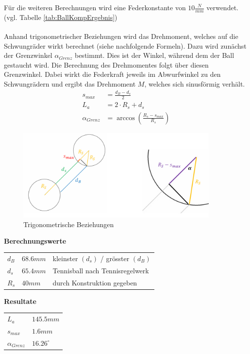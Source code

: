 Für die weiteren Berechnungen wird eine Federkonstante von $10 \frac{N}{mm}$ 
verwendet. (vgl. Tabelle \ref{tab:BallKompErgebnis})\\
\\
Anhand trigonometrischer Beziehungen wird das Drehmoment, welches auf die 
Schwungräder wirkt berechnet (siehe nachfolgende Formeln). Dazu wird zunächst 
der Grenzwinkel $\alpha_{Grenz}$ bestimmt. Dies ist der Winkel, während dem der Ball 
gestaucht wird. Die Berechnung des Drehmomentes folgt über diesen Grenzwinkel. 
Dabei wirkt die Federkraft jeweils im Abwurfwinkel zu den Schwungrädern und 
ergibt das Drehmoment $M$, welches sich sinusförmig verhält. 
%
\begin{align}  
    s_{max} &= \frac{d_B - d_s}{2}\\
    L_a &= 2 \cdot R_s + d_s\\
    \alpha_{Grenz} &= \arccos\left(\frac{R_s - s_{max}}{R_s}\right)
\end{align}

\begin{figure}[h!]
    \centering
    \includegraphics[width=0.9\textwidth]{Enddokumentation/Anhang/Bilder/TrigoBeziehungen.jpg}
    \caption{Trigonometrische Beziehungen}
    \label{fig:trigoBeziehungen}
\end{figure}
\textbf{Berechnungswerte}\\
\begin{tabular}{lll}
    \rule{0pt}{11pt} $d_B$ & $68.6 mm$ & kleinster $(d_s)$ / grösster $(d_B)$ \\
    \rule{0pt}{11pt} $d_s$ & $65.4 mm$ & Tennisball nach Tennisregelwerk \\
    \rule{0pt}{11pt} $R_s$ & $40 mm$ & durch Konstruktion gegeben \\
\end{tabular}

\textbf{Resultate}\\
\begin{tabular}{ll}
    \rule{0pt}{11pt} $L_a$ & $145.5 mm$ \\
    \rule{0pt}{11pt} $s_{max}$ & $1.6 mm$ \\
    \rule{0pt}{11pt} $\alpha_{Grenz}$ & $16.26^\circ$ \\
\end{tabular}

